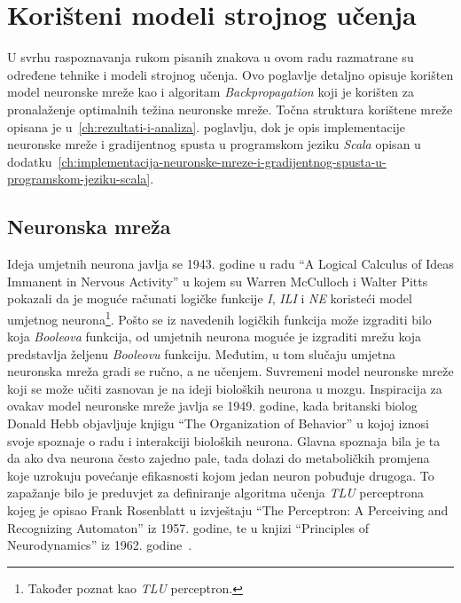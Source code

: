 \chapter{Korišteni modeli strojnog učenja}
\label{ch:koristeni-modeli-strojnog-ucenja}
U svrhu raspoznavanja rukom pisanih znakova u ovom radu razmatrane su određene tehnike i modeli strojnog učenja. Ovo
poglavlje detaljno opisuje korišten model neuronske mreže kao i algoritam \emph{Backpropagation} koji je korišten za
pronalaženje optimalnih težina neuronske mreže. Točna struktura korištene mreže opisana je
u\ \ref{ch:rezultati-i-analiza}. poglavlju, dok je opis implementacije neuronske mreže i gradijentnog spusta u
programskom jeziku \emph{Scala} opisan u
dodatku\ \ref{ch:implementacija-neuronske-mreze-i-gradijentnog-spusta-u-programskom-jeziku-scala}.


\section{Neuronska mreža}
\label{sec:neuronska-mreza}
Ideja umjetnih neurona javlja se 1943. godine u radu ``A Logical Calculus of Ideas Immanent in Nervous Activity'' u
kojem su Warren McCulloch i Walter Pitts pokazali da je moguće računati logičke funkcije \emph{I}, \emph{ILI} i
\emph{NE} koristeći model umjetnog neurona\footnote{Također poznat kao \emph{TLU} perceptron.}. Pošto se iz navedenih
logičkih funkcija može izgraditi bilo koja \emph{Booleova} funkcija, od umjetnih neurona moguće je izgraditi mrežu koja
predstavlja željenu \emph{Booleovu} funkciju. Međutim, u tom slučaju umjetna neuronska mreža gradi se ručno, a ne
učenjem. Suvremeni model neuronske mreže koji se može učiti zasnovan je na ideji bioloških neurona u mozgu. Inspiracija
za ovakav model neuronske mreže javlja se 1949. godine, kada britanski biolog Donald Hebb objavljuje knjigu
``The Organization of Behavior'' u kojoj iznosi svoje spoznaje o radu i interakciji bioloških neurona. Glavna spoznaja
bila je ta da ako dva neurona često zajedno pale, tada dolazi do metaboličkih promjena koje uzrokuju povećanje
efikasnosti kojom jedan neuron pobuđuje drugoga. To zapažanje bilo je preduvjet za definiranje algoritma učenja
\emph{TLU} perceptrona kojeg je opisao Frank Rosenblatt u izvještaju
``The Perceptron: A Perceiving and Recognizing Automaton'' iz 1957. godine, te u knjizi ``Principles of Neurodynamics''
iz 1962. godine\ \citep{cupic2013}.

